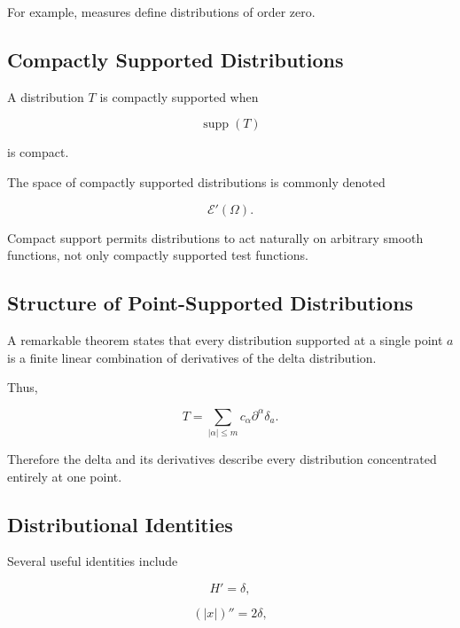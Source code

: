 For example, measures define distributions of order zero.

\subsection{Compactly Supported Distributions}
\label{subsec:compactly-supported-distributions}

A distribution \(T\) is compactly supported when

\[
\boxed{
\operatorname{supp}(T)
}
\]

is compact.

The space of compactly supported distributions is commonly denoted

\[
\boxed{
\mathcal{E}'(\Omega).
}
\]

Compact support permits distributions to act naturally on arbitrary
smooth functions, not only compactly supported test functions.

\subsection{Structure of Point-Supported Distributions}
\label{subsec:point-supported-distributions}

A remarkable theorem states that every distribution supported at a
single point \(a\) is a finite linear combination of derivatives of the
delta distribution.

Thus,

\[
\boxed{
T
=
\sum_{|\alpha|\leq m}
c_\alpha
\partial^\alpha\delta_a.
}
\]

Therefore the delta and its derivatives describe every distribution
concentrated entirely at one point.

\subsection{Distributional Identities}
\label{subsec:distributional-identities}

Several useful identities include

\[
\boxed{
H'=\delta,
}
\]

\[
\boxed{
(|x|)''=2\delta,
}
\]

